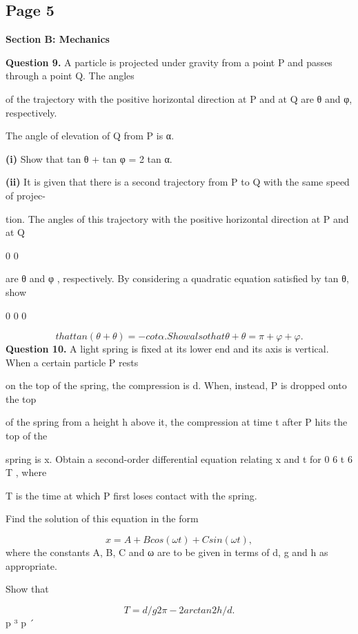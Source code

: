 \documentclass[12pt]{article}
\begin{document}
\subsection*{Page 5}
\begin{flushleft}
\bigskip\textbf{Section B: Mechanics}\par
\bigskip\textbf{Question 9.} A particle is projected under gravity from a point P and passes through a point Q. The angles\par
of the trajectory with the positive horizontal direction at P and at Q are θ and φ, respectively.\par
The angle of elevation of Q from P is α.\par
\textbf{(i)} Show that tan θ + tan φ = 2 tan α.\par
\textbf{(ii)} It is given that there is a second trajectory from P to Q with the same speed of projec-\par
tion. The angles of this trajectory with the positive horizontal direction at P and at Q\par
0 0\par
are θ and φ , respectively. By considering a quadratic equation satisfied by tan θ, show\par
0 0 0\par
\[that tan(θ + θ ) = - cot α. Show also that θ + θ = \pi + φ + φ .\]
\bigskip\textbf{Question 10.} A light spring is fixed at its lower end and its axis is vertical. When a certain particle P rests\par
on the top of the spring, the compression is d. When, instead, P is dropped onto the top\par
of the spring from a height h above it, the compression at time t after P hits the top of the\par
spring is x. Obtain a second-order differential equation relating x and t for 0 6 t 6 T , where\par
T is the time at which P first loses contact with the spring.\par
Find the solution of this equation in the form\par
\[x = A + B cos(ωt) + C sin(ωt) ,\]
where the constants A, B, C and ω are to be given in terms of d, g and h as appropriate.\par
Show that\par
\[T = d/g 2\pi - 2 arctan 2h/d .\]
p ³ p ´\par
\end{flushleft}
\end{document}
